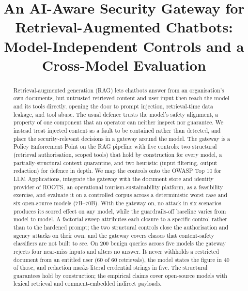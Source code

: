 \documentclass[conference]{IEEEtran}
\begin{document}
\title{An AI-Aware Security Gateway for Retrieval-Augmented Chatbots:\\
Model-Independent Controls and a Cross-Model Evaluation}

\author{
}

\maketitle

\begin{abstract}
Retrieval-augmented generation (RAG) lets chatbots answer from an organisation's
own documents, but untrusted retrieved content and user input then reach the model
and its tools directly, opening the door to prompt injection, retrieval-time data
leakage, and tool abuse. The usual defence trusts the model's safety alignment, a
property of one component that an operator can neither inspect nor guarantee. We
instead treat injected content as a fault to be contained rather than detected, and
place the security-relevant decisions in a gateway around the model. The gateway is a
Policy Enforcement Point on the RAG pipeline with five controls: two structural
(retrieval authorisation, scoped tools) that hold by construction for every model, a
partially-structural context quarantine, and two heuristic (input filtering, output
redaction) for defence in depth. We map the controls onto the OWASP Top 10 for LLM
Applications, integrate the gateway with the document store and identity provider of
ROOTS, an operational tourism-sustainability platform, as a feasibility exercise, and evaluate it on a controlled corpus
across a deterministic worst case and six open-source models (7B--70B). With the
gateway on, no attack in six scenarios produces its scored effect on any model, while
the guardrails-off baseline varies from model to model. A factorial sweep attributes
each closure to a specific control rather than to the hardened prompt; the two
structural controls close the authorisation and agency attacks on their own, and the
gateway covers classes that content-safety classifiers are not built to see. On 200
benign queries across five models the gateway rejects four near-miss inputs and
alters no answer. It never withholds a restricted document from an entitled user (60
of 60 retrievals), the model states the figure in 40 of those, and redaction masks
literal credential strings in five. The
structural guarantees hold by construction; the empirical claims cover open-source
models with lexical retrieval and comment-embedded indirect payloads.
\end{abstract}
\end{document}
